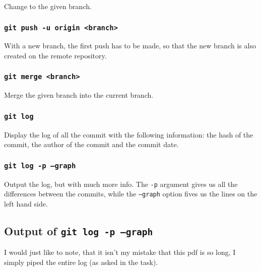 \documentclass[12pt,a4paper]{article}
\begin{document}
				Change to the given branch.
			
			\subsubsection{\texttt{git push -u origin <branch>}}
			
				With a new branch, the first push has to be made, so that the new branch is also created on the remote repository.
			
			\subsubsection{\texttt{git merge <branch>}}
			
				Merge the given branch into the current branch.
				
			\subsubsection{\texttt{git log}}
			
				Display the log of all the commit with the following information: the hash of the commit, the author of the commit and the commit date.
				
			\subsubsection{\texttt{git log -p --graph}}
			
				Output the log, but with much more info. The \texttt{-p} argument gives us all the differences between the commits, while the \texttt{--graph} option fives us the lines on the left hand side.
			
				
			
		\subsection{Output of \texttt{git log -p --graph}}
		
			I would just like to note, that it isn't my mistake that this pdf is so long, I simply piped the entire log (as asked in the task).
			
			\begin{scriptsize}
				
			\end{scriptsize}
\end{document}
